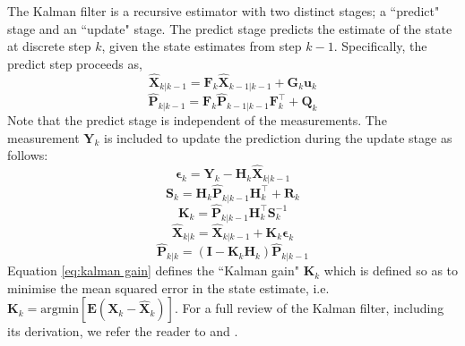 \documentclass[fleqn,usenatbib,useAMS]{mnras}
\begin{document}
The Kalman filter is a recursive estimator with two distinct stages; a ``predict" stage and an ``update" stage. The predict stage predicts the estimate of the state at discrete step $k$, given the state estimates from step $k-1$. Specifically, the predict step proceeds as,
\begin{equation}
	\hat{\boldsymbol{X}}_{k|k-1} =  \boldsymbol{F}_k \hat{\boldsymbol{X}}_{k-1|k-1} + \boldsymbol{G}_k \boldsymbol{u}_k
\end{equation}
\begin{equation}
	\hat{\boldsymbol{P}}_{k|k-1} =  \boldsymbol{F}_k \hat{\boldsymbol{P}}_{k-1|k-1} \boldsymbol{F}_k^\intercal + \boldsymbol{Q}_k 
\end{equation}
Note that the predict stage is independent of the measurements. The measurement $\boldsymbol{Y}_k$ is included to update the prediction during the update stage as follows:
\begin{equation}
	\boldsymbol{\epsilon}_{k} = \boldsymbol{Y}_k - \boldsymbol{H}_k \hat{\boldsymbol{X}}_{k|k-1}
\end{equation} 
\begin{equation}
	\boldsymbol{S}_k = \boldsymbol{H}_k \hat{\boldsymbol{P}}_{k|k-1} \boldsymbol{H}_k^\intercal + \boldsymbol{R}_k
\end{equation}
\begin{equation}
	\boldsymbol{K}_k = \hat{\boldsymbol{P}}_{k|k-1} \boldsymbol{H}_k^\intercal \boldsymbol{S}_k^{-1} \label{eq:kalman gain}
\end{equation}
\begin{equation}
	\hat{\boldsymbol{X}}_{k|k} =\hat{\boldsymbol{X}}_{k|k-1} +\boldsymbol{K}_k  \boldsymbol{\epsilon}_{k}  \label{eq:kalmangainupdate}
\end{equation}
\begin{equation}
		\hat{\boldsymbol{P}}_{k|k} = \left( \boldsymbol{I} - \boldsymbol{K}_k \boldsymbol{H}_k \right) 	\hat{\boldsymbol{P}}_{k|k-1}
\end{equation}
Equation \eqref{eq:kalman gain} defines the ``Kalman gain" $\boldsymbol{K}_k$ which is defined so as to minimise the mean squared error in the state estimate, i.e.  $\boldsymbol{K}_k = \text{argmin} \left[ \boldsymbol{E}(\boldsymbol{X}_k - \hat{\boldsymbol{X}}_k) \right ]$. For a full review of the Kalman filter, including its derivation, we refer the reader to \cite{Gelb:1974} and \cite{zarchan2000fundamentals}. \newline 
\end{document}
